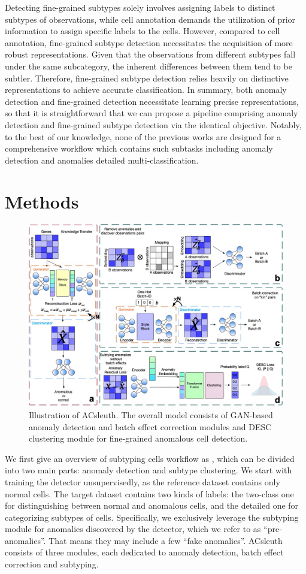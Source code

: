\documentclass{article}
\begin{document}
Detecting fine-grained subtypes solely involves assigning labels to distinct subtypes of observations, 
while cell annotation demands the utilization of prior information to assign specific 
labels to the cells. However, compared to cell annotation, fine-grained subtype detection necessitates 
the acquisition of more robust representations. Given that the observations from different 
subtypes fall under the same subcategory, the inherent differences between them tend to 
be subtler. Therefore, fine-grained subtype detection relies heavily on distinctive representations to 
achieve accurate classification. In summary, both anomaly detection and fine-grained detection 
necessitate learning precise representations, so that it is straightforward that we can 
propose a pipeline comprising anomaly detection and fine-grained subtype detection via the identical objective. 
Notably, to the best of our knowledge, none of the previous works are designed for a 
comprehensive workflow which contains such subtasks including anomaly detection and 
anomalies detailed multi-classification.

\section{Methods}
\begin{figure}
    \centering
    \includegraphics[scale=0.20]{Framework.jpg}
    \caption{Illustration of ACsleuth. The overall model consists of GAN-based anomaly detection and batch effect correction modules and DESC clustering module for fine-grained anomalous cell detection.}
    \label{fig:workflow}
\end{figure}
We first give an overview of subtyping cells workflow as , which can be divided into two main 
parts: anomaly detection and subtype clustering. We start with training the detector 
unsupervisedly, as the reference dataset contains only normal cells. The target dataset 
contains two kinds of labels: the two-class one for distinguishing between normal and 
anomalous cells, and the detailed one for categorizing subtypes of cells. Specifically, 
we exclusively leverage the subtyping module for anomalies discovered by the detector, 
which we refer to as “pre-anomalies”. That means they may include a few “fake anomalies”. 
ACsleuth consists of three modules, each dedicated to anomaly detection, batch effect correction and subtyping.
\end{document}
